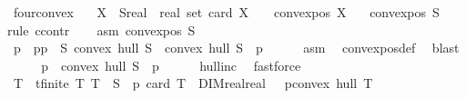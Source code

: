 \begin{isabellebody}
\isanewline
{}\isamarkupfalse%
\ fourconvex{\isacharcolon}{\kern0pt}\isanewline
\ \ \ {\isachardoublequoteopen}{\isasymforall}X\ {\isasymsubseteq}\ {\isacharparenleft}{\kern0pt}S{\isacharcolon}{\kern0pt}{\isacharcolon}{\kern0pt}{\isacharparenleft}{\kern0pt}real\ {\isasymtimes}\ real{\isacharparenright}{\kern0pt}\ set{\isacharparenright}{\kern0pt}{\isachardot}{\kern0pt}\ card\ X\ {\isasymle}\ {}\ {\isasymlongrightarrow}\ convex{\isacharunderscore}{\kern0pt}pos\ X{\isachardoublequoteclose}\isanewline
\ \ \ {\isachardoublequoteopen}convex{\isacharunderscore}{\kern0pt}pos\ S{\isachardoublequoteclose}\isanewline
%
\isadelimproof
%
\endisadelimproof
%
\isatagproof
{}\isamarkupfalse%
{\isacharparenleft}{\kern0pt}rule\ ccontr{\isacharparenright}{\kern0pt}\isanewline
\ \ \isamarkupfalse%
\ asm{\isacharcolon}{\kern0pt}{\isachardoublequoteopen}{\isasymnot}\ convex{\isacharunderscore}{\kern0pt}pos\ S{\isachardoublequoteclose}\isanewline
\ \ \isamarkupfalse%
\ \isamarkupfalse%
\ p\ \ p{\isacharcolon}{\kern0pt}{\isachardoublequoteopen}p\ {\isasymin}\ S{\isachardoublequoteclose}\ {\isachardoublequoteopen}convex\ hull\ S\ {\isacharequal}{\kern0pt}\ convex\ hull\ {\isacharparenleft}{\kern0pt}S\ {\isacharminus}{\kern0pt}\ {\isacharbraceleft}{\kern0pt}p{\isacharbraceright}{\kern0pt}{\isacharparenright}{\kern0pt}{\isachardoublequoteclose}\isanewline
\ \ \ \ \isamarkupfalse%
\ asm\ \isamarkupfalse%
\ convex{\isacharunderscore}{\kern0pt}pos{\isacharunderscore}{\kern0pt}def\ \isamarkupfalse%
\ blast\isanewline
\ \ \isamarkupfalse%
\ \isamarkupfalse%
\ {\isachardoublequoteopen}p\ {\isasymin}\ convex\ hull\ {\isacharparenleft}{\kern0pt}S\ {\isacharminus}{\kern0pt}\ {\isacharbraceleft}{\kern0pt}p{\isacharbraceright}{\kern0pt}{\isacharparenright}{\kern0pt}{\isachardoublequoteclose}\isanewline
\ \ \ \ \isamarkupfalse%
\ hull{\isacharunderscore}{\kern0pt}inc\ \isamarkupfalse%
\ fastforce\isanewline
\ \ \isamarkupfalse%
\ \isamarkupfalse%
\ T\ \ t{\isacharcolon}{\kern0pt}{\isachardoublequoteopen}finite\ T{\isachardoublequoteclose}\ {\isachardoublequoteopen}T\ {\isasymsubseteq}\ S\ {\isacharminus}{\kern0pt}\ {\isacharbraceleft}{\kern0pt}p{\isacharbraceright}{\kern0pt}{\isachardoublequoteclose}\ {\isachardoublequoteopen}card\ T\ {\isasymle}\ DIM{\isacharparenleft}{\kern0pt}real{\isasymtimes}real{\isacharparenright}{\kern0pt}\ {\isacharplus}{\kern0pt}\ {}{\isachardoublequoteclose}\ {\isachardoublequoteopen}p{\isasymin}convex\ hull\ T{\isachardoublequoteclose}\isanewline

\end{isabellebody}
